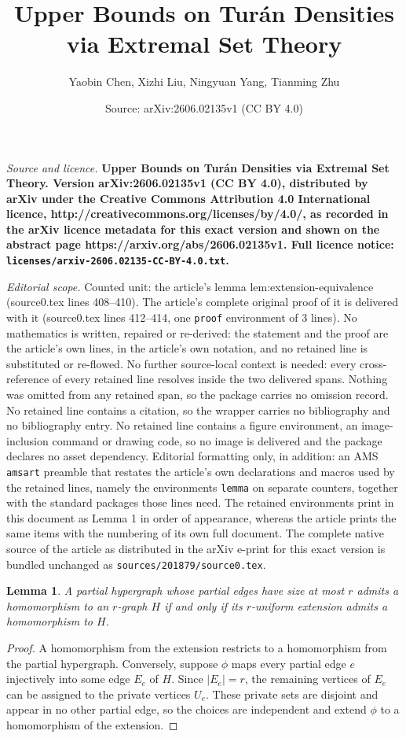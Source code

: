 \documentclass[10pt,a4paper]{amsart}
\title{\bf\Large Upper Bounds on Tur\'an Densities via Extremal Set Theory}
\author{Yaobin Chen, Xizhi Liu, Ningyuan Yang, Tianming Zhu}
\date{Source: arXiv:2606.02135v1 (CC BY 4.0)}
\newtheorem{lemma}{Lemma}
\begin{document}
\maketitle

\noindent\emph{Source and licence.} \bf\Large Upper Bounds on Tur\'an Densities via Extremal Set Theory. Version arXiv:2606.02135v1 (CC BY 4.0), distributed by arXiv under the Creative Commons Attribution 4.0 International licence, http://creativecommons.org/licenses/by/4.0/, as recorded in the arXiv licence metadata for this exact version and shown on the abstract page https://arxiv.org/abs/2606.02135v1. Full licence notice: \texttt{licenses/arxiv-2606.02135-CC-BY-4.0.txt}.\par\smallskip

\noindent\textit{Editorial scope.} Counted unit: the article's lemma lem:extension-equivalence (source0.tex lines 408--410). The article's complete original proof of it is delivered with it (source0.tex lines 412--414, one \texttt{proof} environment of 3 lines). No mathematics is written, repaired or re-derived: the statement and the proof are the article's own lines, in the article's own notation, and no retained line is substituted or re-flowed.  No further source-local context is needed: every cross-reference of every retained line resolves inside the two delivered spans.  Nothing was omitted from any retained span, so the package carries no omission record.  No retained line contains a citation, so the wrapper carries no bibliography and no bibliography entry.  No retained line contains a figure environment, an image-inclusion command or drawing code, so no image is delivered and the package declares no asset dependency.  Editorial formatting only, in addition: an AMS \texttt{amsart} preamble that restates the article's own declarations and macros used by the retained lines, namely the environments \texttt{lemma} on separate counters, together with the standard packages those lines need.  The retained environments print in this document as Lemma 1 in order of appearance, whereas the article prints the same items with the numbering of its own full document.  The complete native source of the article as distributed in the arXiv e-print for this exact version is bundled unchanged as \texttt{sources/201879/source0.tex}.
\begin{lemma}\label{lem:extension-equivalence}
A partial hypergraph whose partial edges have size at most $r$ admits a homomorphism to an $r$-graph $H$ if and only if its $r$-uniform extension admits a homomorphism to $H$.
\end{lemma}

\begin{proof}
A homomorphism from the extension restricts to a homomorphism from the partial hypergraph.  Conversely, suppose $\phi$ maps every partial edge $e$ injectively into some edge $E_e$ of $H$.  Since $|E_e|=r$, the remaining vertices of $E_e$ can be assigned to the private vertices $U_e$.  These private sets are disjoint and appear in no other partial edge, so the choices are independent and extend $\phi$ to a homomorphism of the extension.
\end{proof}
\end{document}
